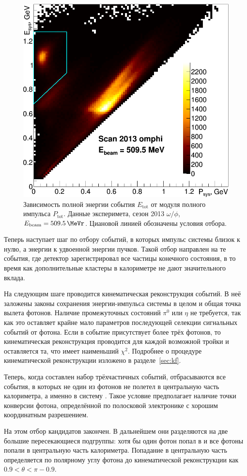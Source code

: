 \begin{figure}[htbp]
	\centering
	\label{fig:EtvsPt5095}
	\includegraphics[width=.5\textwidth]{img/EtvsPt5095.png}
	\caption{Зависимость полной энергии события $E_{\text{tot}}$ от модуля полного импульса $P_{\text{tot}}$.
		Данные эксперимета, сезон 2013 $\omega / \phi$, $E_{\text{beam}} = \SI{509.5}{\MeVr}$.
		Циановой линией обозначены условия отбора.}\label{fig:EtvsPt5095}
\end{figure}

Теперь наступает шаг по отбору событий, в которых импульс системы близок к нулю,
а энергии к удвоенной энергии пучков.
Такой отбор направлен на те события,
где детектор зарегистрировал все частицы конечного состояния,
в то время как дополнительные кластеры в калориметре не дают значительного вклада.

На следующим шаге проводится кинематическая реконструкция событий.
В неё заложены законы сохранения энергии-импульса системы в целом и общая точка вылета фотонов.
Наличие промежуточных состояний $\pi^0$ или $\eta$ не требуется,
так как это оставляет крайне мало параметров последующей селекции сигнальных событий от фотона.
Если в событие присутствует более трёх фотонов,
то кинематическая реконструкция проводится для каждой возможной тройки и оставляется та,
что имеет наименьший $\chi^2$.
Подробнее о процедуре кинематической реконструкции изложено в разделе~\ref{sec:kf}.

Теперь, 
когда составлен набор трёхчастичных событий, 
отбрасываются все события, 
в которых не один из фотонов не полетел в центральную часть калориметра, 
а именно в систему . 
Такое условие предполагает наличие точки конверсии фотона,
определённой по полосковой электронике  с хорошим координатным разрешением.

На этом отбор кандидатов закончен. 
В дальнейшем они разделяются на две большие пересекающиеся подгруппы: 
хотя бы один фотон попал в  и все фотоны попали в центральную часть калориметра.
Попадание в центральную часть определяется по полярному углу фотона до кинематической реконструкции как $0.9 < \theta < \pi - 0.9$.



